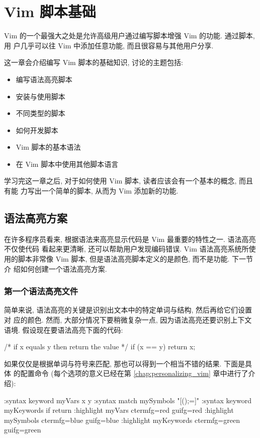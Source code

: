 \chapter{Vim 脚本基础}
\label{chap:basic_vim_scripting}

Vim 的一个最强大之处是允许高级用户通过编写脚本增强 Vim 的功能. 通过脚本, 用
户几乎可以往 Vim 中添加任意功能, 而且很容易与其他用户分享.

这一章会介绍编写 Vim 脚本的基础知识, 讨论的主题包括:
\begin{itemize}
    \item 编写语法高亮脚本
    \item 安装与使用脚本
    \item 不同类型的脚本
    \item 如何开发脚本
    \item Vim 脚本的基本语法
    \item 在 Vim 脚本中使用其他脚本语言
\end{itemize}

学习完这一章之后, 对于如何使用 Vim 脚本, 读者应该会有一个基本的概念, 而且有能
力写出一个简单的脚本, 从而为 Vim 添加新的功能.

\section{语法高亮方案}
\label{sec:syntax_color_schemes}

在许多程序员看来, 根据语法来高亮显示代码是 Vim 最重要的特性之一. 语法高亮不仅使代码
看起来更清晰, 还可以帮助用户发现编码错误. Vim 语法高亮系统所使用的脚本非常像
Vim 脚本, 但是语法高亮脚本定义的是颜色, 而不是功能. 下一节介
绍如何创建一个语法高亮方案.

\subsection{第一个语法高亮文件}
\label{subsec:your_first_syntax_color_file}

简单来说, 语法高亮的关键是识别出文本中的特定单词与结构, 然后再给它们设置对
应的颜色. 然而, 大部分情况下要稍微复杂一点, 因为语法高亮还要识别上下文语境.
假设现在要语法高亮下面的代码:
\begin{vimcode}
/* if x equals y then return the value */
if (x == y)
  {
    return x;
  }
\end{vimcode}

如果仅仅是根据单词与符号来匹配, 那也可以得到一个相当不错的结果. 下面是具体
的配置命令 (每个选项的意义已经在第 \ref{chap:personalizing_vim} 章中进行了介
绍):
\begin{vimcode}
:syntax keyword myVars x y
:syntax match mySymbols "[{}();=]"
:syntax keyword myKeywords if return
:highlight myVars ctermfg=red guifg=red
:highlight mySymbols ctermfg=blue guifg=blue
:highlight myKeywords ctermfg=green guifg=green
\end{vimcode}

